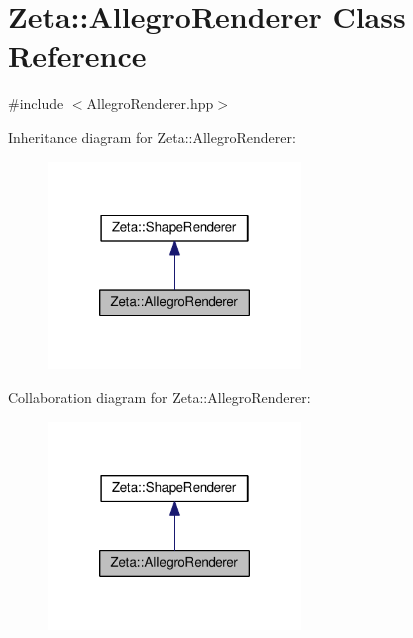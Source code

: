 \hypertarget{classZeta_1_1AllegroRenderer}{\section{Zeta\+:\+:Allegro\+Renderer Class Reference}
\label{classZeta_1_1AllegroRenderer}
}


{\ttfamily \#include $<$Allegro\+Renderer.\+hpp$>$}



Inheritance diagram for Zeta\+:\+:Allegro\+Renderer\+:\nopagebreak
\begin{figure}[H]
\begin{center}
\leavevmode
\includegraphics[width=190pt]{classZeta_1_1AllegroRenderer__inherit__graph}
\end{center}
\end{figure}


Collaboration diagram for Zeta\+:\+:Allegro\+Renderer\+:\nopagebreak
\begin{figure}[H]
\begin{center}
\leavevmode
\includegraphics[width=190pt]{classZeta_1_1AllegroRenderer__coll__graph}
\end{center}
\end{figure}

